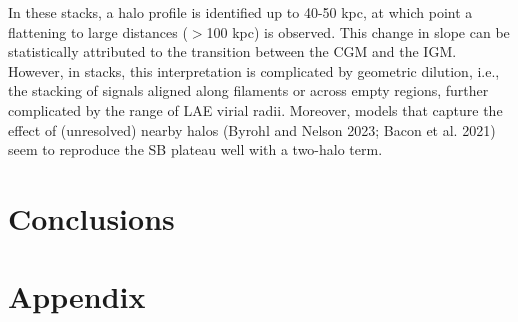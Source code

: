 \documentclass[linenumbers,amsmath,trackchanges,preprint2]{aastex702}
\begin{document}
\cite{tornotti2025}
In these stacks, a halo profile is identified up to 40-50 kpc, at which point a flattening to large distances ($>$100 kpc) is observed. This change in slope can be statistically attributed to the transition between the CGM and the IGM. However, in stacks, this interpretation is complicated by geometric dilution, i.e., the stacking of signals aligned along filaments or across empty regions, further complicated by the range of LAE virial radii. Moreover, models that capture the effect of (unresolved) nearby halos (Byrohl and Nelson 2023; Bacon et al. 2021) seem to reproduce the SB plateau well with a two-halo term. 






\section{Conclusions}


\begin{acknowledgments}
\end{acknowledgments}

\begin{contribution}
\end{contribution}

\facilities{} %
\software{}   %




\section{Appendix}
\end{document}
